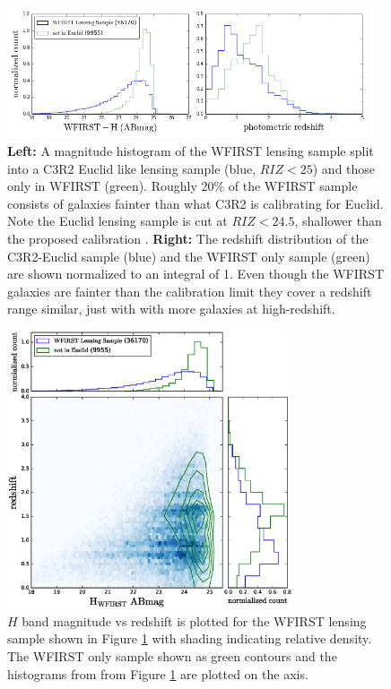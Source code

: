 \begin{figure}
\centering
\includegraphics[trim=0cm 0cm 0cm 0cm, clip,width=0.95\textwidth] {./plots/histogram_wfirst_notEuclid.png}
\caption{{\bf Left:} A magnitude histogram of the WFIRST lensing sample split
into a C3R2 Euclid like lensing sample (blue, $RIZ<25$) and those only in WFIRST
(green).  Roughly 20\% of the WFIRST sample consists of galaxies fainter than
what C3R2 is calibrating for Euclid.  Note the Euclid lensing sample is cut at
$RIZ<24.5$, shallower than the proposed calibration \citep{Masters2015}.  {\bf
Right:} The redshift distribution of the C3R2-Euclid sample (blue) and the
WFIRST only sample (green) are shown normalized to an integral of 1. Even though
the WFIRST galaxies are fainter than the calibration limit they cover a redshift
range similar, just with with more galaxies at high-redshift.   }
\label{fig:EuclidVsWFIRST}
\end{figure}

\begin{figure}
\centering
\includegraphics[trim=0cm 0cm 0cm 0cm, clip,width=0.75\textwidth] {./plots/redshift_magnitude.eps}
\caption{$H$ band magnitude vs redshift is plotted for the WFIRST lensing sample
shown in Figure \ref{fig:EuclidVsWFIRST} with shading indicating relative
density.  The WFIRST only sample shown as green contours and the histograms from
from Figure \ref{fig:EuclidVsWFIRST} are plotted on the axis.   }
\label{fig:EuclidVsWFIRST2}
\end{figure}

